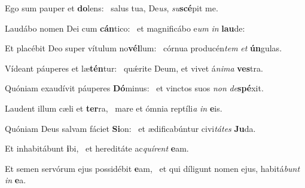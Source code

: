 \item Ego sum pauper et \textbf{do}lens:~\psstar{} salus tua, De\textit{us}, \textit{su}\textbf{scé}pit me.
\item Laudábo nomen Dei cum \textbf{cán}tico:~\psstar{} et magnificábo e\textit{um} \textit{in} \textbf{lau}de:
\item Et placébit Deo super vítulum no\textbf{vél}lum:~\psstar{} córnua producén\textit{tem} \textit{et} \textbf{ún}gulas.
\item Vídeant páuperes et læ\textbf{tén}\-tur:~\psstar{} quǽrite Deum, et vivet á\textit{nima} \textbf{ves}tra.
\item Quóniam exaudívit páuperes \textbf{Dó}minus:~\psstar{} et vinctos suos \textit{non} \textit{de}\textbf{spé}xit.
\item Laudent illum cæli et \textbf{ter}ra,~\psstar{} mare et ómnia reptíli\textit{a} \textit{in} \textbf{e}is.
\item Quóniam Deus salvam fáciet \textbf{Si}on:~\psstar{} et ædificabúntur civi\textit{tátes} \textbf{Ju}da.
\item Et inhabitábunt \textbf{i}bi,~\psstar{} et hereditáte ac\textit{quírent} \textbf{e}am.
\item Et semen servórum ejus possidébit \textbf{e}am,~\psstar{} et qui díligunt nomen ejus, habitá\textit{bunt} \textit{in} \textbf{e}a.

